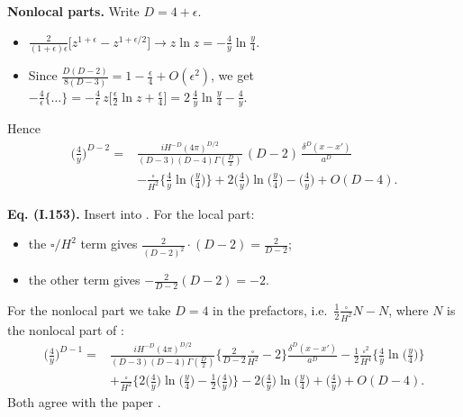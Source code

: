 \textbf{Nonlocal parts.} Write $D=4+\epsilon$.
\begin{itemize}[leftmargin=*,itemsep=2pt]
\item $\frac{2}{(1+\epsilon)\epsilon}\big[z^{1+\epsilon}-z^{1+\epsilon/2}\big]\to z\ln z=-\frac4y\ln\frac y4$.
\item Since $\frac{D(D-2)}{8(D-3)}=1-\frac\epsilon4+O(\epsilon^2)$, we get
$-\frac4\epsilon\{\ldots\}=-\frac4\epsilon\,z\big[\frac\epsilon2\ln z+\frac\epsilon4\big]=2\,\frac4y\ln\frac y4-\frac4y$.
\end{itemize}
Hence
\begin{equation}
\begin{aligned}
\Big(\frac4y\Big)^{D-2}={}&\frac{iH^{-D}(4\pi)^{D/2}}{(D-3)(D-4)\Gamma(\frac D2)}\,(D-2)\,\frac{\delta^D(x-x')}{a^D}\\
&-\frac{\square}{H^2}\Big\{\frac4y\ln\Big(\frac y4\Big)\Big\}+2\Big(\frac4y\Big)\ln\Big(\frac y4\Big)-\Big(\frac4y\Big)+O(D-4).
\end{aligned}
\tag{I.152}
\end{equation}

\textbf{Eq. (I.153).} Insert  into . For the local part:
\begin{itemize}[itemsep=0pt]
\item the $\square/H^2$ term gives $\frac{2}{(D-2)^2}\cdot(D-2)=\frac{2}{D-2}$;
\item the other term gives $-\frac{2}{D-2}(D-2)=-2$.
\end{itemize}
For the nonlocal part we take $D=4$ in the prefactors, i.e.\ $\tfrac12\frac{\square}{H^2}N-N$, where $N$ is the nonlocal part of :
\begin{equation}
\begin{aligned}
\Big(\frac4y\Big)^{D-1}={}&\frac{iH^{-D}(4\pi)^{D/2}}{(D-3)(D-4)\Gamma(\frac D2)}\Big\{\frac{2}{D-2}\frac{\square}{H^2}-2\Big\}\frac{\delta^D(x-x')}{a^D}
-\frac12\frac{\square^2}{H^4}\Big\{\frac4y\ln\Big(\frac y4\Big)\Big\}\\
&+\frac{\square}{H^2}\Big\{2\Big(\frac4y\Big)\ln\Big(\frac y4\Big)-\frac12\Big(\frac4y\Big)\Big\}-2\Big(\frac4y\Big)\ln\Big(\frac y4\Big)+\Big(\frac4y\Big)+O(D-4).
\end{aligned}
\tag{I.153}
\end{equation}
Both agree with the paper \chEok.

